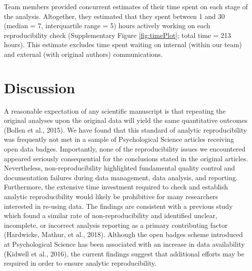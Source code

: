 \documentclass[english,,man,floatsintext]{apa6}
\begin{document}
Team members provided concurrent estimates of their time spent on each stage of the analysis. Altogether, they estimated that they spent between 1 and 30 (median = 7, interquartile range = 5) hours actively working on each reproducibility check (Supplementary Figure \ref{fig:timePlot}; total time = 213 hours). This estimate excludes time spent waiting on internal (within our team) and external (with original authors) communications.

\hypertarget{discussion}{%
\section{Discussion}\label{discussion}}

A reasonable expectation of any scientific manuscript is that repeating the original analyses upon the original data will yield the same quantitative outcomes (Bollen et al., 2015). We have found that this standard of analytic reproducibility was frequently not met in a sample of Psychological Science articles receiving open data badges. Importantly, none of the reproducibility issues we encountered appeared seriously consequential for the conclusions stated in the original articles. Nevertheless, non-reproducibility highlighted fundamental quality control and documentation failures during data management, data analysis, and reporting. Furthermore, the extensive time investment required to check and establish analytic reproducibility would likely be prohibitive for many researchers interested in re-using data. The findings are consistent with a previous study which found a similar rate of non-reproducibility and identified unclear, incomplete, or incorrect analysis reporting as a primary contributing factor (Hardwicke, Mathur, et al., 2018). Although the open badges scheme introduced at Psychological Science has been associated with an increase in data availability (Kidwell et al., 2016), the current findings suggest that additional efforts may be required in order to ensure analytic reproducibility.
\end{document}
